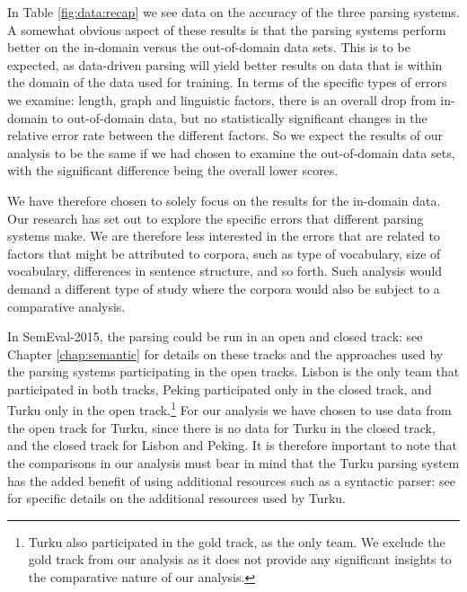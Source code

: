 In Table \ref{fig:data:recap} we see data on the accuracy of the three parsing systems. A somewhat obvious aspect of these results is that the parsing systems perform better on the in-domain versus the out-of-domain data sets. This is to be expected, as data-driven parsing will yield better results on data that is within the domain of the data used for training. In terms of the specific types of errors we examine: length, graph and linguistic factors, there is an overall drop from in-domain to out-of-domain data, but no statistically significant changes in the relative error rate between the different factors. So we expect the results of our analysis to be the same if we had chosen to examine the out-of-domain data sets, with the significant difference being the overall lower scores.

We have therefore chosen to solely focus on the results for the in-domain data. Our research has set out to explore the specific errors that different parsing systems make. We are therefore less interested in the errors that are related to factors that might be attributed to corpora, such as type of vocabulary, size of vocabulary, differences in sentence structure, and so forth. Such analysis would demand a different type of study where the corpora would also be subject to a comparative analysis.

In SemEval-2015, the parsing could be run in an open and closed track: see Chapter \ref{chap:semantic} for details on these tracks and the approaches used by the parsing systems participating in the open tracks. Lisbon is the only team that participated in both tracks, Peking participated only in the closed track, and Turku only in the open track.\footnote{Turku also participated in the gold track, as the only team. We exclude the gold track from our analysis as it does not provide any significant insights to the comparative nature of our analysis.} For our analysis we have chosen to use data from the open track for Turku, since there is no data for Turku in the closed track, and the closed track for Lisbon and Peking. It is therefore important to note that the comparisons in our analysis must bear in mind that the Turku parsing system has the added benefit of using additional resources such as a syntactic parser: see  for specific details on the additional resources used by Turku.

